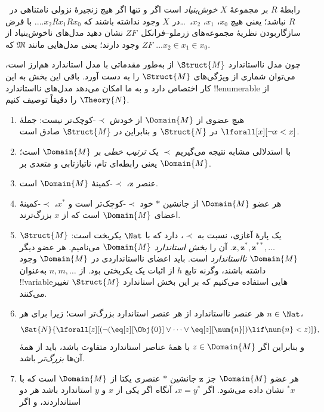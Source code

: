 \documentclass[../../../include/open-logic-section]{subfiles}
\begin{document}
\begin{prob}
رابطهٔ $R$ بر مجموعهٔ $X$ \emph{خوش‌بنیاد} است اگر و تنها اگر هیچ
زنجیرهٔ نزولی نامتناهی در~$R$ نباشد؛ یعنی هیچ
$x_0$، $x_1$، $x_2$،~\dots در $X$ وجود نداشته باشند که
$\dots x_2Rx_1Rx_0$. با فرض سازگار‌بودن نظریهٔ مجموعه‌های
زرملو--فرانکل~$ZF$ نشان دهید مدل‌های ناخوش‌بنیاد از $ZF$ وجود دارند؛
یعنی مدل‌هایی مانند $\mathfrak{M}$ که
$\dots x_2 \in x_1 \in x_0$.
\end{prob}

چون مدل نااستاندارد $\Struct{M}$ از  به‌طور مقدماتی
با مدل استاندارد هم‌ارز است، می‌توان شماری از ویژگی‌های $\Struct{M}$
را به دست آورد. باقی این بخش به این کار اختصاص دارد و به ما امکان
می‌دهد مدل‌های نااستاندارد !!{enumerable} از $\Theory{N}$ را دقیقاً
توصیف کنیم.

\begin{enumerate}
\item هیچ عضوی از $\Domain{M}$ از خودش $\prec$-کوچک‌تر نیست: جملهٔ
  $\lforall[x][\lnot x < x]$ در $\Struct{N}$ و بنابراین در
  $\Struct{M}$ صادق است.
\item با استدلالی مشابه نتیجه می‌گیریم $\prec$ یک
  \emph{ترتیب خطی} بر $\Domain{M}$ است؛ یعنی رابطه‌ای تام، ناتبازتابی
  و متعدی بر $\Domain{M}$.
\item عنصر $\mathbf{z}$، $\prec$-کمینهٔ $\Domain{M}$ است.
\item هر عضو $\Domain{M}$ از جانشین $*$ خود $\prec$-کوچک‌تر است و
  $x^*$، $\prec$-کمینهٔ اعضای $\Domain{M}$ است که از $x$ بزرگ‌ترند.
\item $\Struct{M}$ یک پارهٔ آغازی، نسبت به $\prec$، دارد که با $\Nat$
  یکریخت است:
  $\mathbf{z}, \mathbf{z}^*, \mathbf{z}^{**}, \dots$.
  آن را \emph{بخش استاندارد} $\Domain{M}$ می‌نامیم. هر عضو دیگر
  $\Domain{M}$ \emph{نااستاندارد} است. باید اعضای نااستانداردی در
  $\Domain{M}$ وجود داشته باشند، وگرنه تابع $h$ از اثبات
   یک یکریختی بود. از $n,m,\dots$ به‌عنوان
  !!{variable}هایی استفاده می‌کنیم که بر این بخش استاندارد
  $\Struct{M}$ تغییر می‌کنند.
\item هر عنصر نااستاندارد از هر عنصر استاندارد بزرگ‌تر است؛ زیرا برای
  هر $n \in \Nat$،
  \[
  \Sat{N}{\lforall[z][(\lnot(\eq[z][\Obj{0}] \lor
  \dots \lor \eq[z][\num{n}]) \lif \num{n} < z)]},
  \]
  و بنابراین اگر $z \in \Domain{M}$ با همهٔ عناصر استاندارد متفاوت
  باشد، باید از همهٔ آن‌ها \emph{بزرگ‌تر} باشد.
\item هر عضو $\Domain{M}$ جز $\mathbf{z}$ جانشین $*$ عنصری یکتا از
  $\Domain{M}$ است که با $^*x$ نشان داده می‌شود. اگر $x = y^*$،
  آنگاه اگر یکی از $x$ و $y$ استاندارد باشد هر دو استانداردند، و اگر

\end{enumerate}
\end{document}
